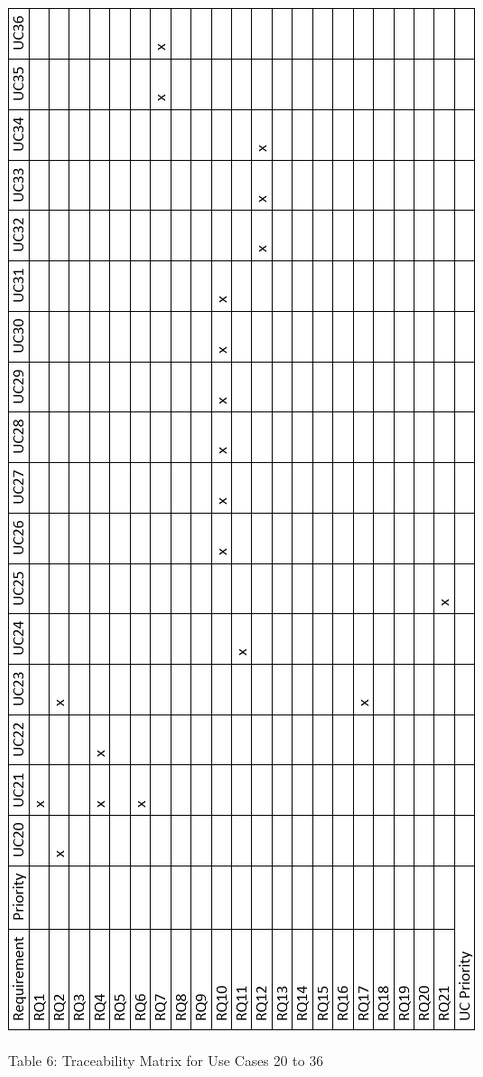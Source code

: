 \documentclass{article}
\begin{document}
{			%
				\includegraphics[scale=0.60]{Traceability_Matrix_2}
			\begin{center}
    			Table 6: Traceability Matrix for Use Cases 20 to 36
			\end{center}
			\clearpage
		}
\end{document}
